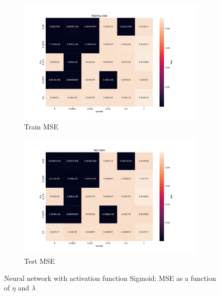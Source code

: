 \begin{figure}[htpb]
\begin{subfigure}{.5\textwidth}
  \centering
  \includegraphics[width=1.2\linewidth]{Figures/PartB/train_sigmoid_MSE(eta,lmb)}
  \caption{Train MSE}
  \label{fig:train_sigmoid_MSE-eta-lmb-}
\end{subfigure}%
\begin{subfigure}{.5\textwidth}
  \centering
  \includegraphics[width=1.2\linewidth]{Figures/PartB/test_sigmoid_MSE(eta,lmb)}
  \caption{Test MSE}
  \label{fig:test_sigmoid_MSE-eta-lmb-}
\end{subfigure}
\caption{Neural network with activation function Sigmoid: MSE as a function of \(\eta \) and \(\lambda \) }
\label{fig:Sigmoid_MSE}
\end{figure}


